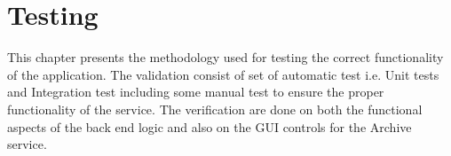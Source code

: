 \chapter{Testing}
This chapter presents the methodology used for testing the correct functionality of the application. The validation consist of set of automatic test i.e.
Unit tests and Integration test including some manual test to ensure the proper functionality of the service. The verification are done on both the functional
aspects of the back end logic and also on the GUI controls for the Archive service.